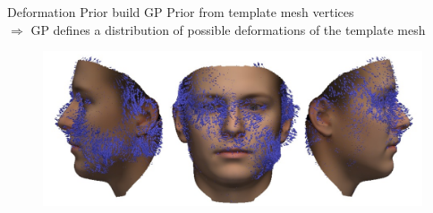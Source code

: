 \documentclass[xcolor=x11names,compress]{beamer}
\begin{document}
\begin{frame}{Deformation Prior}
build GP Prior from template mesh vertices\\
\bigskip
$\Rightarrow$ GP defines a distribution of possible deformations of the template mesh 
\begin{figure}
    \centering
\includegraphics[width=.8\textwidth]{../resources/img/prior_deformations.pdf}
\end{figure}
\end{frame}
\end{document}
